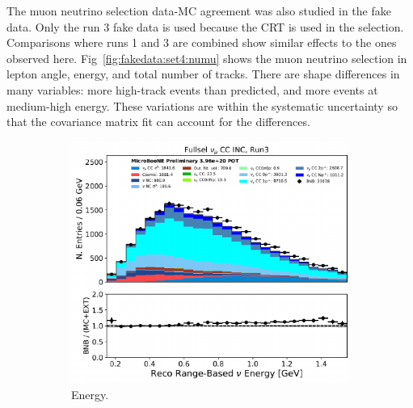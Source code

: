 The muon neutrino selection data-MC agreement was also studied in the fake data.  Only the run 3 fake data is used because the CRT is used in the selection. Comparisons where runs 1 and 3 are combined show similar effects to the ones observed here. 
Fig~\ref{fig:fakedata:set4:numu} shows the muon neutrino selection in lepton angle, energy, and total number of tracks. There are shape differences in many variables: more high-track events than predicted, and more events at medium-high energy.  These variations are within the systematic uncertainty so that the covariance matrix fit can account for the differences.

\begin{figure}[H] 
\begin{center}
    \begin{subfigure}[b]{0.3\textwidth}
    \centering
    \includegraphics[width=1.00\textwidth]{Fakedata/set4/numu_energy.pdf}
    \caption{\label{fig:fakedata:set4:numu_energy} Energy.}
    \end{subfigure}
    \begin{subfigure}[b]{0.3\textwidth}
    \centering

\end{subfigure}
\end{center}
\end{figure}
